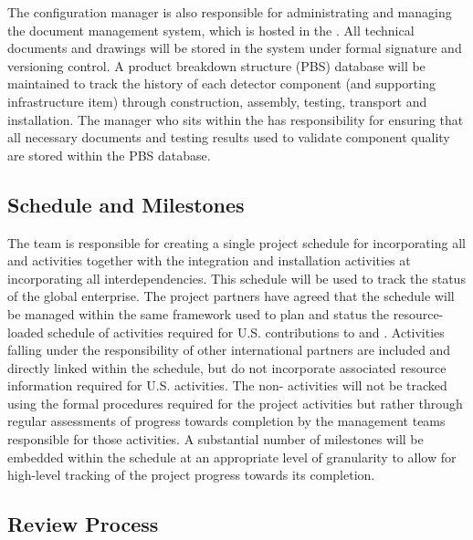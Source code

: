 The configuration manager is also responsible for administrating
and managing the  document management system, 
which is hosted in the .  All technical documents 
and drawings will be stored in the  system under 
formal signature and versioning control.  A product breakdown 
structure (PBS) database will be maintained to track the history 
of each detector component (and supporting infrastructure item) 
through construction, assembly, testing, transport and installation.  
The   manager who sits within the 
 has responsibility for ensuring that all necessary 
documents and testing results used to validate component quality 
are stored within the PBS database.

\subsection{Schedule and Milestones}
\label{sec:dune_schedule}

The  team is responsible for creating a single 
project schedule for  incorporating all 
 and  activities together with the 
integration and installation activities at  
incorporating all interdependencies.  This schedule will 
be used to track the status of the global enterprise.  The 
project partners have agreed that the  
schedule will be managed within the same  framework 
used to plan and status the resource-loaded schedule of 
activities required for U.S.  contributions to 
 and .  Activities falling under the 
responsibility of other international partners are included 
and directly linked within the  schedule, but do 
not incorporate associated resource information required for 
U.S.  activities.  The non- activities 
will not be tracked using the formal  procedures 
required for the  project activities but rather 
through regular assessments of progress towards completion 
by the management teams responsible for those activities.  
A substantial number of milestones will be embedded within 
the schedule at an appropriate level of granularity to allow 
for high-level tracking of the project progress towards its 
completion.

\subsection{Review Process}
\label{sec:dune_review}


